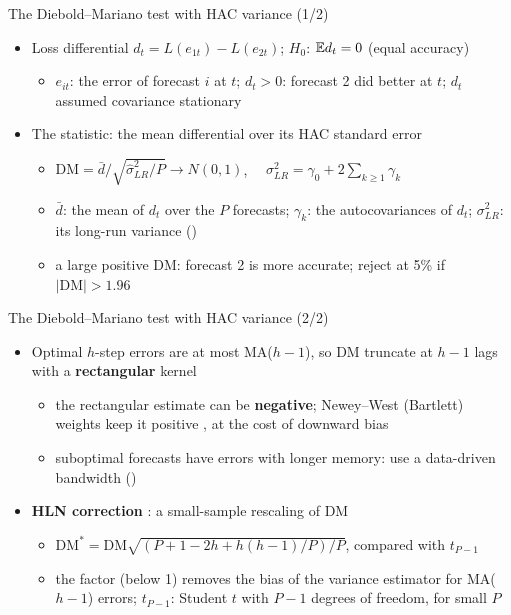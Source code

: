 \begin{frame}{The Diebold--Mariano test with HAC variance (1/2)}
\itemsize{\small}
\begin{itemize}
    \item Loss differential $d_t = L(e_{1t}) - L(e_{2t})$; $H_0$: $\mathbb{E} d_t = 0$ (equal accuracy)
    \begin{itemize}
        \item $e_{it}$: the error of forecast $i$ at $t$; $d_t > 0$: forecast 2 did better at $t$; $d_t$ assumed covariance stationary
    \end{itemize}
    \item The statistic: the mean differential over its HAC standard error
    \begin{itemize}
        \item $\mathrm{DM} = \bar d/\sqrt{\hat\sigma^2_{LR}/P} \to N(0, 1)$, $\quad \sigma^2_{LR} = \gamma_0 + 2\sum_{k \ge 1}\gamma_k$
        \item $\bar d$: the mean of $d_t$ over the $P$ forecasts; $\gamma_k$: the autocovariances of $d_t$; $\sigma^2_{LR}$: its long-run variance ()
        \item a large positive DM: forecast 2 is more accurate; reject at 5\% if $|\mathrm{DM}| > 1.96$
    \end{itemize}
\end{itemize}
\end{frame}

\begin{frame}{The Diebold--Mariano test with HAC variance (2/2)}
\itemsize{\small}
\begin{itemize}
    \item Optimal $h$-step errors are at most MA($h - 1$), so DM truncate at $h - 1$ lags with a \textbf{rectangular} kernel
    \begin{itemize}
        \item the rectangular estimate can be \textbf{negative}; Newey--West (Bartlett) weights keep it positive , at the cost of downward bias
        \item suboptimal forecasts have errors with longer memory: use a data-driven bandwidth ()
    \end{itemize}
    \item \textbf{HLN correction} : a small-sample rescaling of DM
    \begin{itemize}
        \item $\mathrm{DM}^* = \mathrm{DM}\sqrt{(P + 1 - 2h + h(h - 1)/P)/P}$, compared with $t_{P-1}$
        \item the factor (below 1) removes the bias of the variance estimator for MA($h - 1$) errors; $t_{P-1}$: Student $t$ with $P - 1$ degrees of freedom, for small $P$
    \end{itemize}
\end{itemize}
\end{frame}

